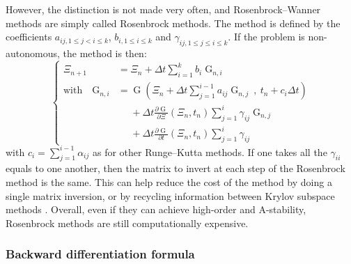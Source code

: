         However, the distinction is not made very often, and Rosenbrock--Wanner methods are simply called Rosenbrock methods.
        The method is defined by the coefficients $a_{ij, 1\leq j<i\leq k}$, $b_{i, 1\leq i\leq k}$ and $\gamma_{ij, 1\leq j\leq i\leq k}$.
        If the problem is non-autonomous, the method is then:
        \begin{equation}
          \left\{\begin{aligned}
            \Xi_{n+1} &= \Xi_n + \Delta t \sum_{i = 1}^k b_i \operatorname{G}_{n,i} \\
            \textrm{with}\quad \operatorname{G}_{n,i} &=
              \operatorname{G}\left(\Xi_n + \Delta t \sum_{j = 1}^{i-1} a_{ij} \operatorname{G}_{n,j} \ ,\  t_n + c_i \Delta t\right)\\
              &\phantom{= {}} +\Delta t \frac{\partial \operatorname{G}}{\partial \Xi}\left(\Xi_n, t_n\right) \sum_{j = 1}^{i} \gamma_{ij} \operatorname{G}_{n,j} \\
              &\phantom{= {}} +\Delta t \frac{\partial \operatorname{G}}{\partial t}\left(\Xi_n, t_n\right) \sum_{j = 1}^i \gamma_{ij}
          \end{aligned}\right.
        \end{equation}
        with $c_i = \sum_{j = 1}^{i - 1} \alpha_{ij}$ as for other Runge--Kutta methods.
        If one takes all the $\gamma_{ii}$ equals to one another, then the matrix to invert at each step of the Rosenbrock method is the same.
        This can help reduce the cost of the method by doing a single matrix inversion, or by recycling information between Krylov subspace methods \cite{Gaul2014}.
        Overall, even if they can achieve high-order and A-stability, Rosenbrock methods are still computationally expensive.


      \subsubsection{Backward differentiation formula}

